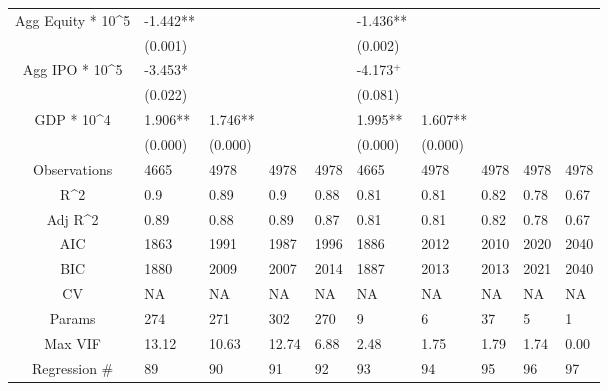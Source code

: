 \documentclass{article}
\begin{document}
\begin{table}[H]
\begin{tabular}{|clllllllll|}
  Agg Equity * 10^5 & -1.442** &  &  &  & -1.436** &  &  &  &  \\
   & (0.001) &  &  &  & (0.002) &  &  &  &  \\
  Agg IPO * 10^5 & -3.453* &  &  &  & -4.173$^{+}$ &  &  &  &  \\
   & (0.022) &  &  &  & (0.081) &  &  &  &  \\
  GDP * 10^4 & 1.906** & 1.746** &  &  & 1.995** & 1.607** &  &  &  \\
   & (0.000) & (0.000) &  &  & (0.000) & (0.000) &  &  &  \\
  \hline
 Observations & 4665 & 4978 & 4978 & 4978 & 4665 & 4978 & 4978 & 4978 & 4978 \\
  R^2 & 0.9 & 0.89 & 0.9 & 0.88 & 0.81 & 0.81 & 0.82 & 0.78 & 0.67 \\
  Adj R^2 & 0.89 & 0.88 & 0.89 & 0.87 & 0.81 & 0.81 & 0.82 & 0.78 & 0.67 \\
  AIC & 1863 & 1991 & 1987 & 1996 & 1886 & 2012 & 2010 & 2020 & 2040 \\
  BIC & 1880 & 2009 & 2007 & 2014 & 1887 & 2013 & 2013 & 2021 & 2040 \\
  CV & NA & NA & NA & NA & NA & NA & NA & NA & NA \\
  Params & 274 & 271 & 302 & 270 & 9 & 6 & 37 & 5 & 1 \\
  Max VIF & 13.12 & 10.63 & 12.74 & 6.88 & 2.48 & 1.75 & 1.79 & 1.74 & 0.00 \\
  Regression \# & 89 & 90 & 91 & 92 & 93 & 94 & 95 & 96 & 97 \\
   \hline
\end{tabular}

\end{table}
\end{document}

